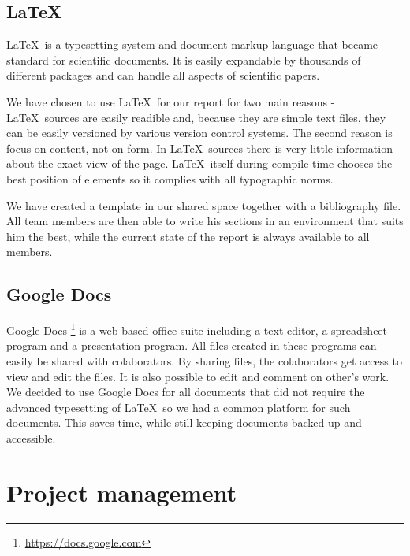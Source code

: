 \documentclass[11pt,a4paper,titlepage,oneside]{report}
\begin{document}
  \subsection{\LaTeX}
  \LaTeX~is a typesetting system and document markup language that became standard for scientific documents. It is easily expandable by thousands of different packages and can handle all aspects of scientific papers.

  We have chosen to use \LaTeX~for our report for two main reasons - \LaTeX~sources are easily readible and, because they are simple text files, they can be easily versioned by various version control systems. The second reason is focus on content, not on form. In \LaTeX~sources there is very little information about the exact view of the page. \LaTeX~itself during compile time chooses the best position of elements so it complies with all typographic norms.

  We have created a template in our shared space together with a bibliography file. All team members are then able to write his sections in an environment that suits him the best, while the current state of the report is always available to all members.

  \subsection{Google Docs}
  Google Docs \footnote{\url{https://docs.google.com}} is a web based office suite including a text editor, a spreadsheet program and a presentation program. All files created in these programs can easily be shared with colaborators. By sharing files, the colaborators get access to view and edit the files. It is also possible to edit and comment on other's work. We decided to use Google Docs for all documents that did not require the advanced typesetting of \LaTeX~so we had a common platform for such documents. This saves time, while still keeping documents backed up and accessible. 

\section{Project management}
\end{document}
